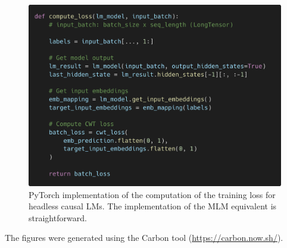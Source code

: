 \begin{figure}[htbp]
    \centering
    \includegraphics[width=\linewidth]{sources/part_2/headless/imgs/train_implementation.png}
    \caption{PyTorch implementation of the computation of the training loss for headless causal LMs. The implementation of the MLM equivalent is straightforward.}
    \label{fig:train_implementation}
\end{figure}

The figures were generated using the Carbon tool (\url{https://carbon.now.sh/}).

